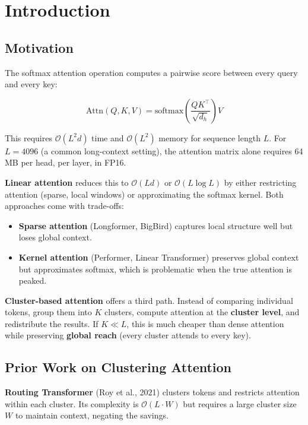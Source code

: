 \section{Introduction}

\subsection{Motivation}

The softmax attention operation computes a pairwise score between every 
query and every key:

\begin{equation}
\text{Attn}(Q, K, V) = \text{softmax}\!\left(\frac{Q K^\top}{\sqrt{d_h}}\right) V
\end{equation}

This requires $\mathcal{O}(L^2 d)$ time and $\mathcal{O}(L^2)$ memory for 
sequence length $L$. For $L = 4096$ (a common long-context setting), the 
attention matrix alone requires 64 MB per head, per layer, in FP16.

\textbf{Linear attention} reduces this to $\mathcal{O}(L d)$ or 
$\mathcal{O}(L \log L)$ by either restricting attention (sparse, local 
windows) or approximating the softmax kernel. Both approaches come with 
trade-offs:

\begin{itemize}
\item \textbf{Sparse attention} (Longformer, BigBird) captures local structure well
  but loses global context.
\item \textbf{Kernel attention} (Performer, Linear Transformer) preserves global
  context but approximates softmax, which is problematic when the true
  attention is peaked.

\end{itemize}
\textbf{Cluster-based attention} offers a third path. Instead of comparing 
individual tokens, group them into $K$ clusters, compute attention at the 
\textbf{cluster level}, and redistribute the results. If $K \ll L$, this is much 
cheaper than dense attention while preserving \textbf{global reach} (every 
cluster attends to every key).

\subsection{Prior Work on Clustering Attention}

\textbf{Routing Transformer} (Roy et al., 2021) clusters tokens and restricts 
attention within each cluster. Its complexity is $\mathcal{O}(L \cdot W)$ 
but requires a large cluster size $W$ to maintain context, negating the 
savings.

